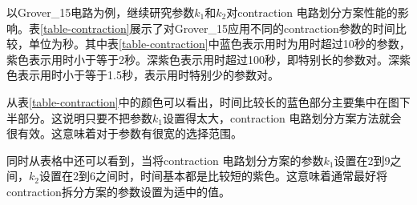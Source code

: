 以Grover\_15电路为例，继续研究参数$k_1$和$k_2$对contraction 电路划分方案性能的影响。表\ref{table-contraction}展示了对Grover\_15应用不同的contraction参数的时间比较，单位为秒。其中表\ref{table-contraction}中蓝色表示用时为用时超过10秒的参数，紫色表示用时小于等于2秒。深紫色表示用时超过100秒，即特别长的参数对。深紫色表示用时小于等于1.5秒，表示用时特别少的参数对。

从表\ref{table-contraction}中的颜色可以看出，时间比较长的蓝色部分主要集中在图下半部分。这说明只要不把参数$k_1$设置得太大，contraction 电路划分方案方法就会很有效。这意味着对于参数有很宽的选择范围。

同时从表格中还可以看到，当将contraction 电路划分方案的参数$k_1$设置在2到9之间，$k_2$设置在2到6之间时，时间基本都是比较短的紫色。这意味着通常最好将contraction拆分方案的参数设置为适中的值。



